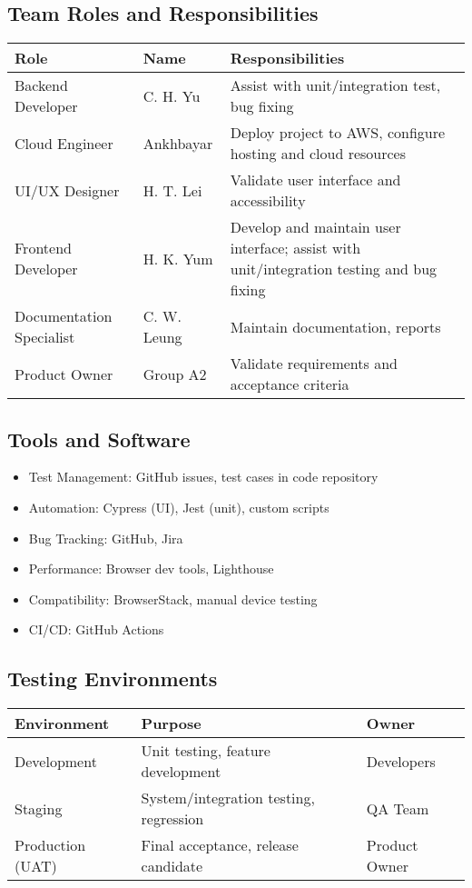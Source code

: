 \documentclass[a4paper,11pt]{scrartcl}
\begin{document}
\subsection{Team Roles and Responsibilities}
\begin{tabularx}{\textwidth}{l l X}
\toprule
Role & Name & Responsibilities \\
\midrule
Backend Developer & C. H. Yu & Assist with unit/integration test, bug fixing \\
Cloud Engineer & Ankhbayar & Deploy project to AWS, configure hosting and cloud resources \\
UI/UX Designer & H. T. Lei & Validate user interface and accessibility \\
Frontend Developer & H. K. Yum & Develop and maintain user interface; assist with unit/integration testing and bug fixing \\
Documentation Specialist & C. W. Leung & Maintain documentation, reports \\
Product Owner & Group A2 & Validate requirements and acceptance criteria \\
\bottomrule
\end{tabularx}

\subsection{Tools and Software}
\begin{itemize}[leftmargin=*]
    \item Test Management: GitHub issues, test cases in code repository
    \item Automation: Cypress (UI), Jest (unit), custom scripts
    \item Bug Tracking: GitHub, Jira
    \item Performance: Browser dev tools, Lighthouse
    \item Compatibility: BrowserStack, manual device testing
    \item CI/CD: GitHub Actions
\end{itemize}

\subsection{Testing Environments}
\begin{tabularx}{\textwidth}{l X l}
\toprule
Environment & Purpose & Owner \\
\midrule
Development & Unit testing, feature development & Developers \\
Staging & System/integration testing, regression & QA Team \\
Production (UAT) & Final acceptance, release candidate & Product Owner \\
\bottomrule
\end{tabularx}
\end{document}
